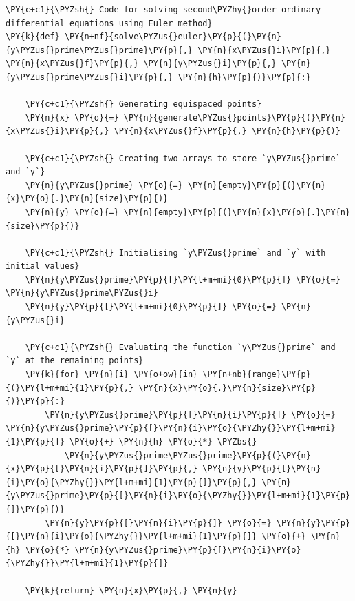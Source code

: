     \begin{tcolorbox}[breakable, size=fbox, boxrule=1pt, pad at break*=1mm,colback=cellbackground, colframe=cellborder]
\begin{Verbatim}[commandchars=\\\{\}]
\PY{c+c1}{\PYZsh{} Code for solving second\PYZhy{}order ordinary differential equations using Euler method}
\PY{k}{def} \PY{n+nf}{solve\PYZus{}euler}\PY{p}{(}\PY{n}{y\PYZus{}prime\PYZus{}prime}\PY{p}{,} \PY{n}{x\PYZus{}i}\PY{p}{,} \PY{n}{x\PYZus{}f}\PY{p}{,} \PY{n}{y\PYZus{}i}\PY{p}{,} \PY{n}{y\PYZus{}prime\PYZus{}i}\PY{p}{,} \PY{n}{h}\PY{p}{)}\PY{p}{:}

    \PY{c+c1}{\PYZsh{} Generating equispaced points}
    \PY{n}{x} \PY{o}{=} \PY{n}{generate\PYZus{}points}\PY{p}{(}\PY{n}{x\PYZus{}i}\PY{p}{,} \PY{n}{x\PYZus{}f}\PY{p}{,} \PY{n}{h}\PY{p}{)}

    \PY{c+c1}{\PYZsh{} Creating two arrays to store `y\PYZus{}prime` and `y`}
    \PY{n}{y\PYZus{}prime} \PY{o}{=} \PY{n}{empty}\PY{p}{(}\PY{n}{x}\PY{o}{.}\PY{n}{size}\PY{p}{)}
    \PY{n}{y} \PY{o}{=} \PY{n}{empty}\PY{p}{(}\PY{n}{x}\PY{o}{.}\PY{n}{size}\PY{p}{)}

    \PY{c+c1}{\PYZsh{} Initialising `y\PYZus{}prime` and `y` with initial values}
    \PY{n}{y\PYZus{}prime}\PY{p}{[}\PY{l+m+mi}{0}\PY{p}{]} \PY{o}{=} \PY{n}{y\PYZus{}prime\PYZus{}i}
    \PY{n}{y}\PY{p}{[}\PY{l+m+mi}{0}\PY{p}{]} \PY{o}{=} \PY{n}{y\PYZus{}i}

    \PY{c+c1}{\PYZsh{} Evaluating the function `y\PYZus{}prime` and `y` at the remaining points}
    \PY{k}{for} \PY{n}{i} \PY{o+ow}{in} \PY{n+nb}{range}\PY{p}{(}\PY{l+m+mi}{1}\PY{p}{,} \PY{n}{x}\PY{o}{.}\PY{n}{size}\PY{p}{)}\PY{p}{:}
        \PY{n}{y\PYZus{}prime}\PY{p}{[}\PY{n}{i}\PY{p}{]} \PY{o}{=} \PY{n}{y\PYZus{}prime}\PY{p}{[}\PY{n}{i}\PY{o}{\PYZhy{}}\PY{l+m+mi}{1}\PY{p}{]} \PY{o}{+} \PY{n}{h} \PY{o}{*} \PYZbs{}
            \PY{n}{y\PYZus{}prime\PYZus{}prime}\PY{p}{(}\PY{n}{x}\PY{p}{[}\PY{n}{i}\PY{p}{]}\PY{p}{,} \PY{n}{y}\PY{p}{[}\PY{n}{i}\PY{o}{\PYZhy{}}\PY{l+m+mi}{1}\PY{p}{]}\PY{p}{,} \PY{n}{y\PYZus{}prime}\PY{p}{[}\PY{n}{i}\PY{o}{\PYZhy{}}\PY{l+m+mi}{1}\PY{p}{]}\PY{p}{)}
        \PY{n}{y}\PY{p}{[}\PY{n}{i}\PY{p}{]} \PY{o}{=} \PY{n}{y}\PY{p}{[}\PY{n}{i}\PY{o}{\PYZhy{}}\PY{l+m+mi}{1}\PY{p}{]} \PY{o}{+} \PY{n}{h} \PY{o}{*} \PY{n}{y\PYZus{}prime}\PY{p}{[}\PY{n}{i}\PY{o}{\PYZhy{}}\PY{l+m+mi}{1}\PY{p}{]}

    \PY{k}{return} \PY{n}{x}\PY{p}{,} \PY{n}{y}
\end{Verbatim}
\end{tcolorbox}

